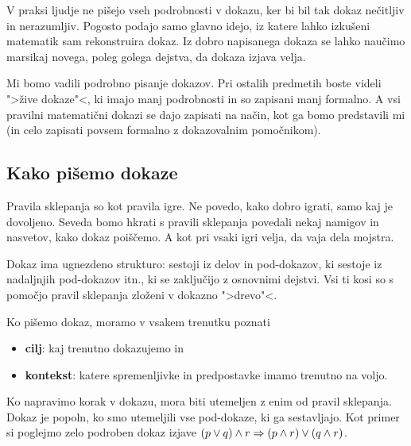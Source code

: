 V praksi ljudje ne pišejo vseh podrobnosti v dokazu, ker bi bil tak dokaz nečitljiv in nerazumljiv. Pogosto podajo samo glavno idejo, iz katere lahko izkušeni matematik sam rekonstruira dokaz. Iz dobro napisanega dokaza se lahko naučimo marsikaj novega, poleg golega dejstva, da dokaza izjava velja.

Mi bomo vadili podrobno pisanje dokazov. Pri ostalih predmetih boste videli ">žive dokaze"<, ki imajo manj podrobnosti in so zapisani manj formalno. A vsi pravilni matematični dokazi se dajo zapisati na način, kot ga bomo predstavili mi (in celo zapisati povsem formalno z dokazovalnim pomočnikom).

\subsection{Kako pišemo dokaze}

Pravila sklepanja so kot pravila igre. Ne povedo, kako dobro igrati, samo kaj je dovoljeno. Seveda bomo hkrati s pravili sklepanja povedali nekaj namigov in nasvetov, kako dokaz poiščemo. A kot pri vsaki igri velja, da vaja dela mojstra.

Dokaz ima ugnezdeno strukturo: sestoji iz delov in pod-dokazov, ki sestoje iz nadaljnjih pod-dokazov itn., ki se zaključijo z osnovnimi dejstvi. Vsi ti kosi so s pomočjo pravil sklepanja zloženi v dokazno ">drevo"<.

Ko pišemo dokaz, moramo v vsakem trenutku poznati
%
\begin{itemize}
\item \textbf{cilj}: kaj trenutno dokazujemo in
\item \textbf{kontekst}: katere spremenljivke in predpostavke imamo trenutno na voljo.
\end{itemize}
%
Ko napravimo korak v dokazu, mora biti utemeljen z enim od pravil sklepanja. Dokaz je
popoln, ko smo utemeljili vse pod-dokaze, ki ga sestavljajo. Kot primer si poglejmo zelo podroben dokaz izjave
%
$(p \lor q) \land r \Rightarrow (p \land r) \lor (q \land r)$.

